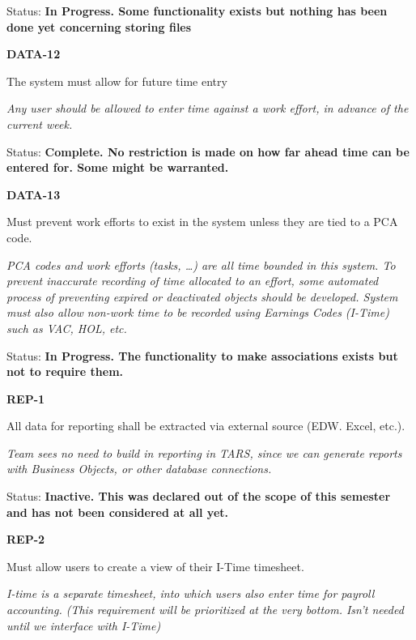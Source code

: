 \noindent Status: \textbf{In Progress.  Some functionality exists but nothing has been done yet concerning storing files} \\

\noindent 

\noindent \textbf{DATA-12}

\noindent The system must allow for future time entry

\noindent \textit{Any user should be allowed to enter time against a work effort, in advance of the current week.}

Status: \textbf{Complete.  No restriction is made on how far ahead time can be entered for.  Some  might be warranted.}\\

\noindent 

\noindent \textbf{DATA-13}

\noindent Must prevent work efforts to exist in the system unless they are tied to a PCA code.

\noindent \textit{ PCA codes and work efforts (tasks, \dots ) are all time bounded in this system. To prevent inaccurate recording of time allocated to an effort, some automated process of preventing expired or deactivated objects should be developed. System must also allow non-work time to be recorded using Earnings Codes (I-Time) such as VAC, HOL, etc.}

\noindent Status: \textbf{In Progress.  The functionality to make associations exists but not to require them.}\\

\noindent 

\noindent \textbf{REP-1}

\noindent All data for reporting shall be extracted via external source (EDW. Excel, etc.).

\noindent \textit{Team sees no need to build in reporting in TARS, since we can generate reports with Business Objects, or other database connections. }

\noindent Status: \textbf{Inactive.   This was declared out of the scope of this semester and has not been considered at all yet.}\\

\noindent 

\noindent \textbf{REP-2}

\noindent Must allow users to create a view of their I-Time timesheet.

\noindent \textit{I-time is a separate timesheet, into which users also enter time for payroll accounting. (This requirement will be prioritized at the very bottom.  Isn't needed until we interface with I-Time)}

